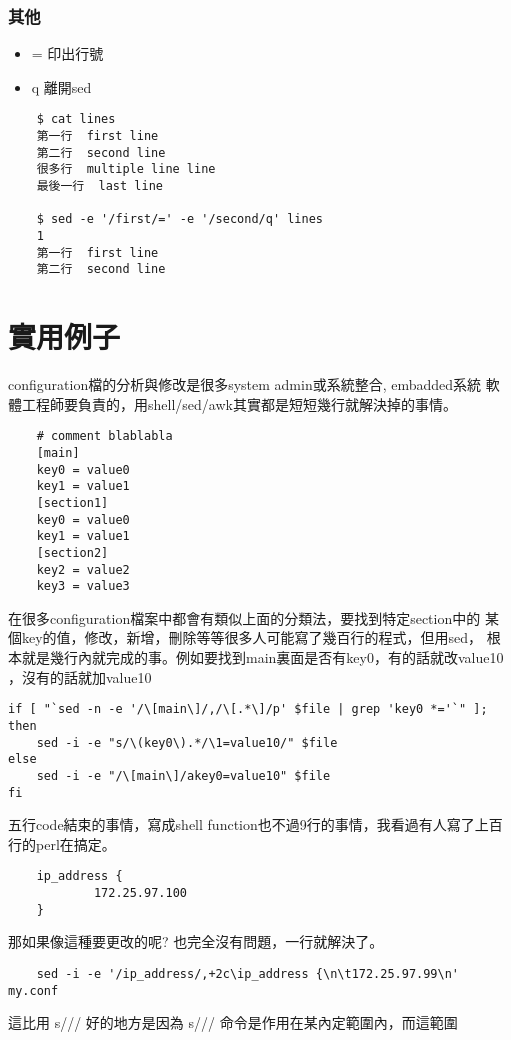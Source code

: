     \subsubsection{其他}
    \begin{itemize}
    \item = 印出行號
    \item q 離開sed
    \end{itemize}
    \begin{verbatim}
    $ cat lines
    第一行  first line
    第二行  second line
    很多行  multiple line line
    最後一行  last line

    $ sed -e '/first/=' -e '/second/q' lines
    1
    第一行  first line
    第二行  second line
    \end{verbatim}
    
    \section{實用例子}
    configuration檔的分析與修改是很多system admin或系統整合, embadded系統
    軟體工程師要負責的，用shell/sed/awk其實都是短短幾行就解決掉的事情。
    \begin{verbatim}
    # comment blablabla
    [main]
    key0 = value0
    key1 = value1
    [section1]
    key0 = value0
    key1 = value1
    [section2]
    key2 = value2
    key3 = value3
    \end{verbatim}
    在很多configuration檔案中都會有類似上面的分類法，要找到特定section中的
    某個key的值，修改，新增，刪除等等很多人可能寫了幾百行的程式，但用sed，
    根本就是幾行內就完成的事。例如要找到main裏面是否有key0，有的話就改value10
    ，沒有的話就加value10
    \begin{verbatim}
if [ "`sed -n -e '/\[main\]/,/\[.*\]/p' $file | grep 'key0 *='`" ]; then
    sed -i -e "s/\(key0\).*/\1=value10/" $file
else
    sed -i -e "/\[main\]/akey0=value10" $file
fi
    \end{verbatim}
    五行code結束的事情，寫成shell function也不過9行的事情，我看過有人寫了上百
    行的perl在搞定。
    \begin{verbatim}
    ip_address {
            172.25.97.100
    }
    \end{verbatim}
    那如果像這種要更改的呢? 也完全沒有問題，一行就解決了。
    \begin{verbatim}
    sed -i -e '/ip_address/,+2c\ip_address {\n\t172.25.97.99\n' my.conf
    \end{verbatim}
    這比用 s/// 好的地方是因為 s/// 命令是作用在某內定範圍內，而這範圍
